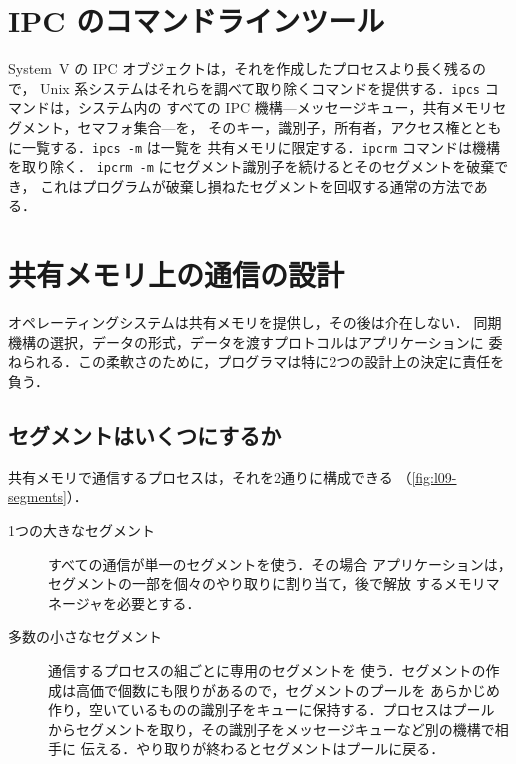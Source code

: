 \documentclass[../main.tex]{subfiles}
\begin{document}
\section{IPC のコマンドラインツール}
\label{sec:l09-tools}

System~V の IPC オブジェクトは，それを作成したプロセスより長く残るので，
Unix 系システムはそれらを調べて取り除くコマンドを提供する．\texttt{ipcs} コマンドは，システム内の
すべての IPC 機構---メッセージキュー，共有メモリセグメント，セマフォ集合---を，
そのキー，識別子，所有者，アクセス権とともに一覧する．\texttt{ipcs -m} は一覧を
共有メモリに限定する．\texttt{ipcrm} コマンドは機構を取り除く．
\texttt{ipcrm -m} にセグメント識別子を続けるとそのセグメントを破棄でき，
これはプログラムが破棄し損ねたセグメントを回収する通常の方法である．%

\section{共有メモリ上の通信の設計}
\label{sec:l09-design}

オペレーティングシステムは共有メモリを提供し，その後は介在しない．
同期機構の選択，データの形式，データを渡すプロトコルはアプリケーションに
委ねられる．この柔軟さのために，プログラマは特に2つの設計上の決定に責任を
負う．

\subsection{セグメントはいくつにするか}

共有メモリで通信するプロセスは，それを2通りに構成できる
（\cref{fig:l09-segments}）．
\begin{description}
  \item[1つの大きなセグメント] すべての通信が単一のセグメントを使う．その場合
    アプリケーションは，セグメントの一部を個々のやり取りに割り当て，後で解放
    するメモリマネージャを必要とする．
  \item[多数の小さなセグメント] 通信するプロセスの組ごとに専用のセグメントを
    使う．セグメントの作成は高価で個数にも限りがあるので，セグメントのプールを
    あらかじめ作り，空いているものの識別子をキューに保持する．プロセスはプール
    からセグメントを取り，その識別子をメッセージキューなど別の機構で相手に
    伝える．やり取りが終わるとセグメントはプールに戻る．
\end{description}
\end{document}
